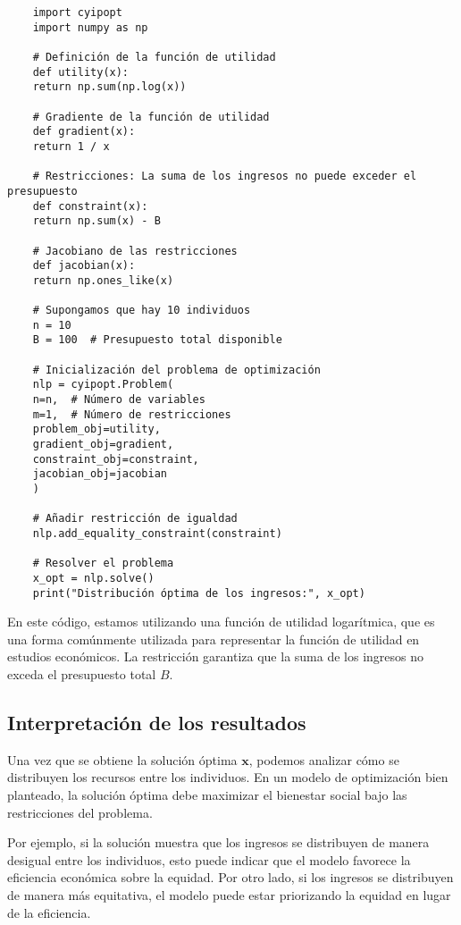 \begin{verbatim}
	import cyipopt
	import numpy as np
	
	# Definición de la función de utilidad
	def utility(x):
	return np.sum(np.log(x))
	
	# Gradiente de la función de utilidad
	def gradient(x):
	return 1 / x
	
	# Restricciones: La suma de los ingresos no puede exceder el presupuesto
	def constraint(x):
	return np.sum(x) - B
	
	# Jacobiano de las restricciones
	def jacobian(x):
	return np.ones_like(x)
	
	# Supongamos que hay 10 individuos
	n = 10
	B = 100  # Presupuesto total disponible
	
	# Inicialización del problema de optimización
	nlp = cyipopt.Problem(
	n=n,  # Número de variables
	m=1,  # Número de restricciones
	problem_obj=utility,
	gradient_obj=gradient,
	constraint_obj=constraint,
	jacobian_obj=jacobian
	)
	
	# Añadir restricción de igualdad
	nlp.add_equality_constraint(constraint)
	
	# Resolver el problema
	x_opt = nlp.solve()
	print("Distribución óptima de los ingresos:", x_opt)
\end{verbatim}

\begin{flushleft}
	En este código, estamos utilizando una función de utilidad logarítmica, que es una forma comúnmente utilizada para representar la función de utilidad en estudios económicos. La restricción garantiza que la suma de los ingresos no exceda el presupuesto total $B$.
\end{flushleft}

\subsection{Interpretación de los resultados}

\begin{flushleft}
	Una vez que se obtiene la solución óptima $\mathbf{x}$, podemos analizar cómo se distribuyen los recursos entre los individuos. En un modelo de optimización bien planteado, la solución óptima debe maximizar el bienestar social bajo las restricciones del problema.
\end{flushleft}

\begin{flushleft}
	Por ejemplo, si la solución muestra que los ingresos se distribuyen de manera desigual entre los individuos, esto puede indicar que el modelo favorece la eficiencia económica sobre la equidad. Por otro lado, si los ingresos se distribuyen de manera más equitativa, el modelo puede estar priorizando la equidad en lugar de la eficiencia.
\end{flushleft}

